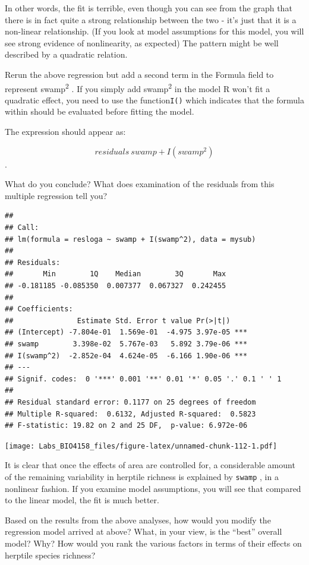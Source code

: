 \documentclass[
  12pt,
]{book}
\makeatletter
\newenvironment{kframe}{%
\medskip{}
\setlength{\fboxsep}{.8em}
\def\at@end@of@kframe{}%
\ifinner\ifhmode%
 \def\at@end@of@kframe{\end{minipage}}%
 \begin{minipage}{\columnwidth}%
\fi\fi%
\def\FrameCommand##1{\hskip\@totalleftmargin \hskip-\fboxsep
\colorbox{incolor}{##1}\hskip-\fboxsep
    \hskip-\linewidth \hskip-\@totalleftmargin \hskip\columnwidth}%
\MakeFramed {\advance\hsize-\width
  \@totalleftmargin\z@ \linewidth\hsize
  \@setminipage}}%
{\par\unskip\endMakeFramed%
\at@end@of@kframe}
\newenvironment{rmdblock}[1]
 {
 \begin{itemize}
 \renewcommand{\labelitemi}{
   \raisebox{-.7\height}[0pt][0pt]{
     {\setkeys{Gin}{width=3em,keepaspectratio}\texttt{[image: images/\#1]}}
   }
 }
 \begin{kframe}
 \setlength{\fboxsep}{1em}
 \item
 }
 {
 \end{kframe}
 \end{itemize}
 }
\newenvironment{rmdcode}
  {\begin{rmdblock}{screen}}
  {\end{rmdblock}}
\makeatother
\begin{document}
In other words, the fit is terrible, even though you can see from the graph that there is in fact quite a strong relationship between the two - it's just that it is a non-linear relationship. (If you look at model assumptions for this model, you will see strong evidence of nonlinearity, as expected) The pattern might be well described by a quadratic relation.

\begin{rmdcode}
Rerun the above regression but add a second term in the Formula field to represent swamp\textsuperscript{2} . If you simply add swamp\textsuperscript{2} in the model R won't fit a quadratic effect, you need to use the function\texttt{I()} which indicates that the formula within should be evaluated before fitting the model.

The expression should appear as:

\[ residuals ~ swamp + I(swamp^2)\].

What do you conclude? What does examination of the residuals from this multiple regression tell you?
\end{rmdcode}

\begin{verbatim}
## 
## Call:
## lm(formula = resloga ~ swamp + I(swamp^2), data = mysub)
## 
## Residuals:
##       Min        1Q    Median        3Q       Max 
## -0.181185 -0.085350  0.007377  0.067327  0.242455 
## 
## Coefficients:
##               Estimate Std. Error t value Pr(>|t|)    
## (Intercept) -7.804e-01  1.569e-01  -4.975 3.97e-05 ***
## swamp        3.398e-02  5.767e-03   5.892 3.79e-06 ***
## I(swamp^2)  -2.852e-04  4.624e-05  -6.166 1.90e-06 ***
## ---
## Signif. codes:  0 '***' 0.001 '**' 0.01 '*' 0.05 '.' 0.1 ' ' 1
## 
## Residual standard error: 0.1177 on 25 degrees of freedom
## Multiple R-squared:  0.6132, Adjusted R-squared:  0.5823 
## F-statistic: 19.82 on 2 and 25 DF,  p-value: 6.972e-06
\end{verbatim}

\texttt{[image: Labs\_BIO4158\_files/figure-latex/unnamed-chunk-112-1.pdf]}

It is clear that once the effects of area are controlled for, a considerable amount of the remaining variability in herptile richness is explained by \texttt{swamp} , in a nonlinear fashion. If you examine model assumptions, you will see that compared to the linear model, the fit is much better.

Based on the results from the above analyses, how would you modify the regression model arrived at above? What, in your view, is the ``best'' overall model? Why? How would you rank the various factors in terms of their effects on herptile species richness?
\end{document}
